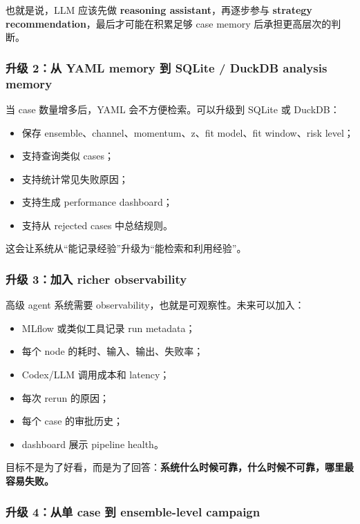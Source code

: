 \documentclass[11pt,a4paper,fontset=none]{ctexart}
\begin{document}
也就是说，LLM 应该先做 \textbf{reasoning assistant}，再逐步参与 \textbf{strategy recommendation}，最后才可能在积累足够 case memory 后承担更高层次的判断。

\subsubsection{升级 2：从 YAML memory 到 SQLite / DuckDB analysis memory}

当 case 数量增多后，YAML 会不方便检索。可以升级到 SQLite 或 DuckDB：

\begin{itemize}[leftmargin=2em]
  \item 保存 ensemble、channel、momentum、z、fit model、fit window、risk level；
  \item 支持查询类似 cases；
  \item 支持统计常见失败原因；
  \item 支持生成 performance dashboard；
  \item 支持从 rejected cases 中总结规则。
\end{itemize}

这会让系统从“能记录经验”升级为“能检索和利用经验”。

\subsubsection{升级 3：加入 richer observability}

高级 agent 系统需要 observability，也就是可观察性。未来可以加入：

\begin{itemize}[leftmargin=2em]
  \item MLflow 或类似工具记录 run metadata；
  \item 每个 node 的耗时、输入、输出、失败率；
  \item Codex/LLM 调用成本和 latency；
  \item 每次 rerun 的原因；
  \item 每个 case 的审批历史；
  \item dashboard 展示 pipeline health。
\end{itemize}

目标不是为了好看，而是为了回答：\textbf{系统什么时候可靠，什么时候不可靠，哪里最容易失败。}

\subsubsection{升级 4：从单 case 到 ensemble-level campaign}
\end{document}
